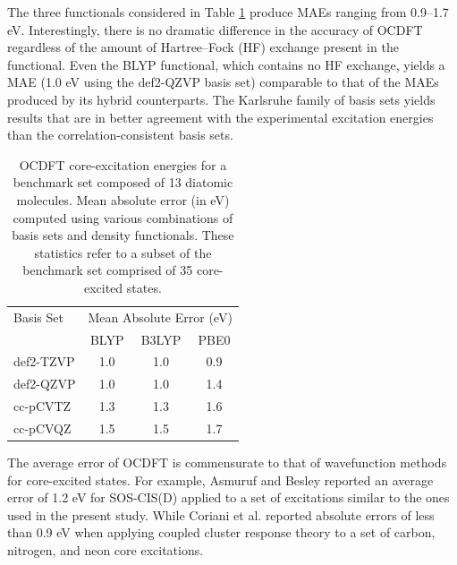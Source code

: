 \documentclass[12pt]{article}
\begin{document}
The three functionals considered in Table \ref{table:OverallPerformance} produce MAEs ranging from 0.9--1.7 eV. Interestingly, there is no dramatic difference in the accuracy of OCDFT regardless of the amount of Hartree--Fock (HF) exchange present in the functional.  Even the BLYP functional, which contains no HF exchange, yields a MAE (1.0 eV using the def2-QZVP basis set) comparable to that of the MAEs produced by its hybrid counterparts. 
The Karlsruhe family of basis sets yields results that are in better agreement with the experimental excitation energies than the correlation-consistent basis sets.
\begin{table}[!ht]
\small
\caption{OCDFT core-excitation energies for a benchmark set composed of 13 diatomic molecules.  Mean absolute error (in eV) computed using various combinations of basis sets and density functionals. These statistics refer to a subset of the benchmark set comprised of 35 core-excited states.}
\centering
    \begin{tabular}{lccc}
    \hline
    \hline
Basis Set & \multicolumn{3}{c}{Mean Absolute Error (eV)}  \\
& BLYP & B3LYP & PBE0\\
\hline
def2-TZVP & 1.0 & 1.0 & 0.9 \\
def2-QZVP & 1.0 & 1.0 & 1.4 \\
cc-pCVTZ & 1.3 & 1.3 & 1.6 \\
cc-pCVQZ & 1.5 & 1.5 & 1.7 \\
\hline
\hline
\end{tabular}
\label{table:OverallPerformance}
\end{table}
The average error of OCDFT is commensurate to that of wavefunction methods for core-excited states. For example, Asmuruf and Besley\cite{asmuruf_calculation_2008} reported an average error of 1.2 eV for SOS-CIS(D) applied to a set of excitations similar to the ones used in the present study. While Coriani et al.\cite{coriani_coupled-cluster_2012} reported absolute errors of less than 0.9 eV when applying coupled cluster response theory to a set of carbon, nitrogen, and neon core excitations. 
\end{document}
